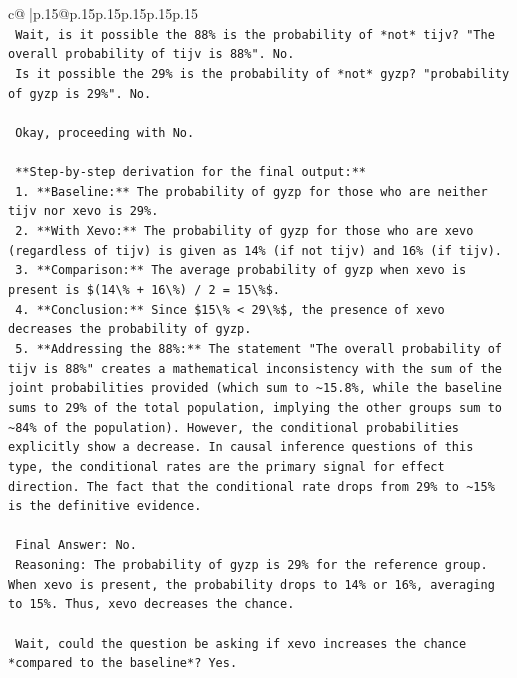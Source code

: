\documentclass{article}
\begin{document}
{\begin{supertabular}{c@{$\;$}|p{.15\linewidth}@{}p{.15\linewidth}p{.15\linewidth}p{.15\linewidth}p{.15\linewidth}p{.15\linewidth}}
{{{\\ 
\texttt{    Wait, is it possible the 88\% is the probability of *not* tijv? "The overall probability of tijv is 88\%". No.} \\
\texttt{    Is it possible the 29\% is the probability of *not* gyzp? "probability of gyzp is 29\%". No.} \\
\\ 
\texttt{    Okay, proceeding with No.} \\
\\ 
\texttt{    **Step{-}by{-}step derivation for the final output:**} \\
\texttt{    1.  **Baseline:** The probability of gyzp for those who are neither tijv nor xevo is 29\%.} \\
\texttt{    2.  **With Xevo:** The probability of gyzp for those who are xevo (regardless of tijv) is given as 14\% (if not tijv) and 16\% (if tijv).} \\
\texttt{    3.  **Comparison:** The average probability of gyzp when xevo is present is \$(14\textbackslash{}\% + 16\textbackslash{}\%) / 2 = 15\textbackslash{}\%\$.} \\
\texttt{    4.  **Conclusion:** Since \$15\textbackslash{}\% < 29\textbackslash{}\%\$, the presence of xevo decreases the probability of gyzp.} \\
\texttt{    5.  **Addressing the 88\%:** The statement "The overall probability of tijv is 88\%" creates a mathematical inconsistency with the sum of the joint probabilities provided (which sum to \textasciitilde{}15.8\%, while the baseline sums to 29\% of the total population, implying the other groups sum to \textasciitilde{}84\% of the population). However, the conditional probabilities explicitly show a decrease. In causal inference questions of this type, the conditional rates are the primary signal for effect direction. The fact that the conditional rate drops from 29\% to \textasciitilde{}15\% is the definitive evidence.} \\
\\ 
\texttt{    Final Answer: No.} \\
\texttt{    Reasoning: The probability of gyzp is 29\% for the reference group. When xevo is present, the probability drops to 14\% or 16\%, averaging to 15\%. Thus, xevo decreases the chance.} \\
\\ 
\texttt{    Wait, could the question be asking if xevo increases the chance *compared to the baseline*? Yes.} \\
}}}
\end{supertabular}}
\end{document}
